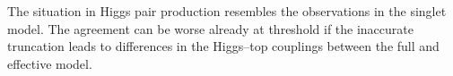 The situation in Higgs pair production resembles the observations in
the singlet model.  The agreement can be worse already at threshold if
the inaccurate truncation leads to differences in the Higgs--top
couplings between the full and effective model.\medskip



